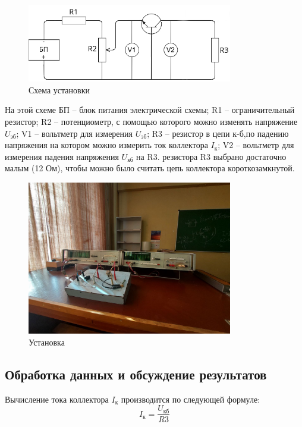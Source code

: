 \begin{figure}[H]
\centering
\includegraphics[width=0.8\textwidth]{Схема установки}
\caption{Схема установки}
\label{fig:Схема установки}
\end{figure}
На этой схеме БП – блок питания электрической схемы; R1 – ограничительный
резистор; R2 – потенциометр, с помощью которого можно изменять напряжение $U_{\text{эб}}$; V1 – вольтметр для измерения $U_{\text{эб}}$; R3 – резистор в цепи к-б,по падению напряжения на котором можно измерить ток коллектора $I_{\text{к}}$; V2 – вольтметр для измерения падения напряжения $U_{\text{кб}}$ на R3.
 резистора R3 выбрано достаточно малым (12 Ом), чтобы
можно было считать цепь коллектора короткозамкнутой.


\begin{figure}[H]
\centering
\includegraphics[width=0.8\textwidth]{Установка.jpg}
\caption{Установка}
\label{fig:установка}
\end{figure}

\subsection{Обработка данных и обсуждение результатов}
Вычисление тока коллектора $I_{\text{к}}$ производится по следующей формуле:
\begin{equation}
   I_{\text{к}}=\frac{U_{\text{кб}}}{R3}
   \label{eq:5}
\end{equation}


